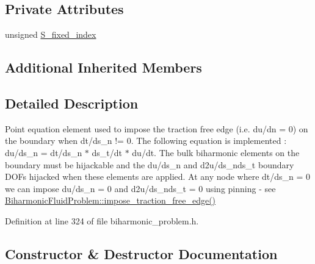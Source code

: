 \subsection*{Private Attributes}
\begin{DoxyCompactItemize}
\item 
unsigned \hyperlink{classoomph_1_1BiharmonicFluidBoundaryElement_a4f72d42e59d5797067b69b31b9e440f5}{S\+\_\+fixed\+\_\+index}
\end{DoxyCompactItemize}
\subsection*{Additional Inherited Members}


\subsection{Detailed Description}
Point equation element used to impose the traction free edge (i.\+e. du/dn = 0) on the boundary when dt/ds\+\_\+n != 0. The following equation is implemented \+: du/ds\+\_\+n = dt/ds\+\_\+n $\ast$ ds\+\_\+t/dt $\ast$ du/dt. The bulk biharmonic elements on the boundary must be hijackable and the du/ds\+\_\+n and d2u/ds\+\_\+nds\+\_\+t boundary D\+O\+Fs hijacked when these elements are applied. At any node where dt/ds\+\_\+n = 0 we can impose du/ds\+\_\+n = 0 and d2u/ds\+\_\+nds\+\_\+t = 0 using pinning -\/ see \hyperlink{classoomph_1_1BiharmonicFluidProblem_a1cc57555bbd0ceef1d93010c133ac597}{Biharmonic\+Fluid\+Problem\+::impose\+\_\+traction\+\_\+free\+\_\+edge()} 

Definition at line 324 of file biharmonic\+\_\+problem.\+h.



\subsection{Constructor \& Destructor Documentation}
\mbox{\label{classoomph_1_1BiharmonicFluidBoundaryElement_a7753395db6939adf4c2ebf5b7d251cef}} 
